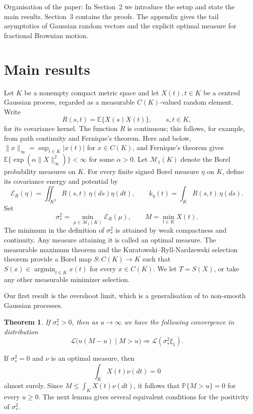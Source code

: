 \documentclass[11pt]{amsart}
\newtheorem{theorem}{Theorem}[section]
\theoremstyle{definition}
\theoremstyle{remark}
\DeclareMathOperator*{\argmin}{argmin}
\newcommand{\Pp}{\mathbb P}
\newcommand{\Ee}{\mathbb E}
\newcommand{\cM}{\mathcal M_1}
\begin{document}
Organisation of the paper: In Section~2 we introduce the setup and state
the main results.  Section~3 contains the proofs.  The appendix gives the
tail asymptotics of Gaussian random vectors and the explicit optimal
measure for fractional Brownian motion.

\section{Main results}
 
Let $K$ be a nonempty compact metric space and let
$X(t),t\in K$ be a centred Gaussian process, regarded as a measurable
$C(K)$-valued random element.  Write
\[
 R(s,t)=\Ee\{X(s)X(t)\}, \qquad s,t\in K,
\]
for its covariance kernel.  The function $R$ is continuous; this follows,
for example, from path continuity and Fernique's theorem.  Here and below,
$\|x\|_\infty=\sup_{t\in K}|x(t)|$ for $x\in C(K)$, and Fernique's theorem
gives $\Ee\{\exp(\alpha\|X\|_\infty^2)\}<\infty$ for some $\alpha>0$.
Let $\cM(K)$ denote the Borel probability measures on $K$.  For every
finite signed Borel measure $\eta$ on $K$, define its covariance energy
and potential by
\[
 \mathcal E_R(\eta)=\iint_{K^2}R(s,t)\,\eta(ds)\eta(dt),
 \qquad
 k_\eta(t)=\int_KR(s,t)\,\eta(ds).
\]
Set
\[
 \sigma_*^2=\min_{\mu\in\cM(K)}\mathcal E_R(\mu),
 \qquad
 M=\min_{t\in K}X(t).
\]
The minimum in the definition of $\sigma_*^2$ is attained by weak
compactness and continuity.  Any measure attaining it is called an
optimal measure.
The measurable maximum theorem and the Kuratowski--Ryll-Nardzewski
selection theorem provide a Borel map $S:C(K)\to K$ such that
$S(x)\in\argmin_{t\in K}x(t)$ for every $x\in C(K)$.
We let $T=S(X)$, or take any other measurable minimizer selection.

%

Our first result is the overshoot limit, which is a generalisation of \cite[Theorem 4.3]{chakrabarty2018asymptotic} to non-smooth Gaussian processes.

\begin{theorem} 
\label{thm:overshoot}
If   $\sigma_*^2>0$,  then as $u\to\infty$ we have the following convergence in distribution
\[
 \mathcal L\bigl(u(M-u)\mid M>u\bigr)
 \Longrightarrow \mathcal L(\sigma_*^2\xi_1).
\] 
\end{theorem}
If $\sigma_*^2=0$ and $\nu$ is an optimal measure, then
\[
 \int_KX(t)\nu(dt)=0
\]
almost surely.  Since $M\leq\int_KX(t)\nu(dt)$, it follows that
$\Pp\{M>u\}=0$ for every $u\geq0$.  The next lemma gives several
equivalent conditions for the positivity of $\sigma_*^2$.
\end{document}
